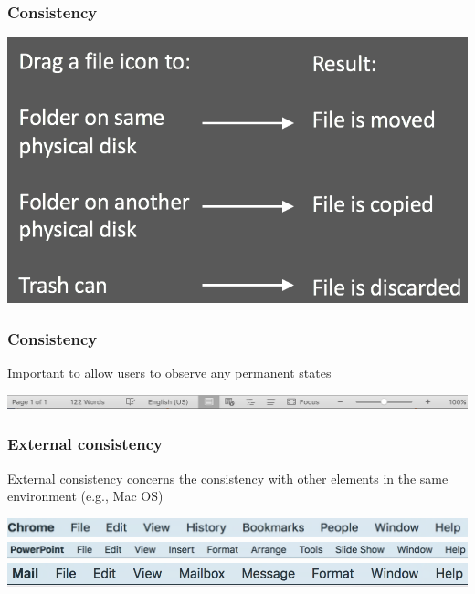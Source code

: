 \documentclass{beamer}
\begin{document}
\begin{frame}
\frametitle{Consistency}
\centering
\includegraphics[width=0.9\linewidth]{consistent6}
\end{frame}

\begin{frame}
\frametitle{Consistency}
Important to allow users to observe any permanent states
\vspace{10pt}

\includegraphics[width=1\linewidth]{visible3}
\end{frame}

\begin{frame}
\frametitle{External consistency}
External consistency concerns the consistency with other elements in the same environment (e.g., Mac OS)
\vspace{10pt}

\includegraphics[width=0.8\linewidth]{consistent3}
\includegraphics[width=0.8\linewidth]{consistent4}
\includegraphics[width=0.7\linewidth]{consistent5}
\end{frame}
\end{document}
